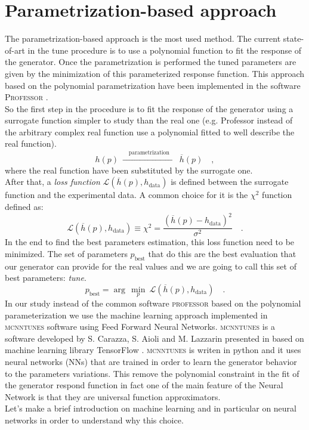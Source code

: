 \section{Parametrization-based approach}

The parametrization-based approach is the most used method. The current state-of-art in the tune procedure is to use a polynomial function to fit the response of the generator. Once the parametrization is performed the tuned parameters are given by the minimization of this parameterized response function. This approach based on the polynomial parametrization have been  implemented in the software \textsc{Professor} \cite{Buckley:2009bj}. 
\\
So the first step in the procedure is to fit the response of the generator using a surrogate function simpler to study than the real one (e.g. Professor instead of the arbitrary complex real function use a polynomial fitted to well describe the real function).
\begin{equation}
	h(p)\ \xrightarrow{\quad \text{parametrization}\quad }\ \overline{h}(p)\quad ,
\end{equation}
where the real function have been substituted by the surrogate one. 
\\
After that, a \textit{loss function} $\mathcal{L}(\overline{h}(p),h_{\text{data}})$ is defined between the surrogate function and the experimental data. A common choice for it is the $\chi^2$ function defined as:
\begin{equation}
	\mathcal{L}(\overline{h}(p),h_{\text{data}})\equiv \chi^2=\frac{(\overline{h}(p)-h_{\text{data}})^2}{\sigma^2}\quad.
\end{equation}
In the end to find the best parameters estimation, this loss function need to be minimized. The set of parameters $p_{\text{best}}$ that do this are the best evaluation that our generator can provide for the real values and we are going to call this set of best parameters: \textit{tune}.
\begin{equation}
	p_{\text{best}}=\arg\,\min_p\ \mathcal{L}(\overline{h}(p),h_{\text{data}})\quad.
\end{equation}
In our study instead of the common software \textsc{professor} based on the polynomial parameterization we use the machine learning approach implemented in \textsc{mcnntunes} software \cite{MCNNTUNESonGitHub}
using Feed Forward Neural Networks. \textsc{mcnntunes} is a software developed by S. Carazza, S. Aioli and M. Lazzarin presented in \cite{MCNNTUNESarticle} based on machine learning library TensorFlow \cite{tensorflow2015-whitepaper}. \textsc{mcnntunes} is writen in python and it uses neural networks (NNs) that are trained in order to learn the generator behavior to the parameters variations. This remove the polynomial constraint in the fit of the generator respond function in fact one of the main feature of the Neural Network is that they are universal function approximators.
\\
Let's make a brief introduction on machine learning and in particular on neural networks in order to understand why this choice.

